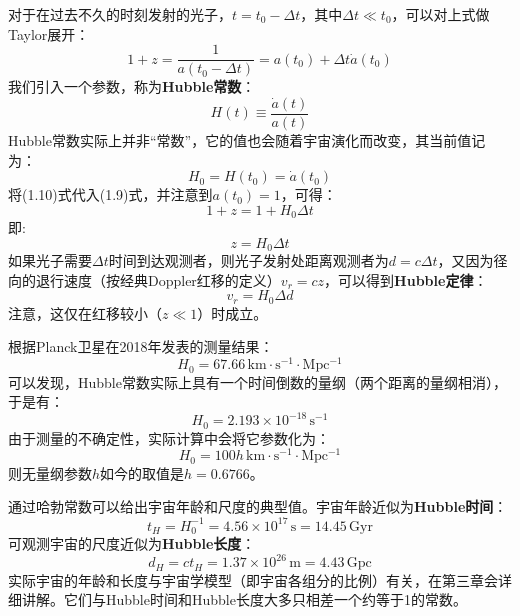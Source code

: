 \documentclass[fontset=none,openany,a4paper]{ctexbook}
\begin{document}
对于在过去不久的时刻发射的光子，$t = t_0 - \Delta t$，其中$\Delta t \ll t_0$，可以对上式做Taylor展开：
\begin{equation}
    1 + z = \frac{1}{a(t_0 - \Delta t)} = a(t_0) + \Delta t \dot{a}(t_0)
\end{equation}
我们引入一个参数，称为\textbf{Hubble常数}：
\begin{equation}
    H(t) \equiv \frac{\dot{a}(t)}{a(t)}
\end{equation}
Hubble常数实际上并非“常数”，它的值也会随着宇宙演化而改变，其当前值记为：
\begin{equation}
    H_0 = H(t_0) = \dot{a}(t_0)
\end{equation}
将(1.10)式代入(1.9)式，并注意到$a(t_0) = 1$，可得：
\begin{equation}
    1 + z = 1 + H_0 \Delta t
\end{equation}
即:
\begin{equation}
    z = H_0 \Delta t
\end{equation}
如果光子需要$\Delta t$时间到达观测者，则光子发射处距离观测者为$d = c\Delta t$，又因为径向的退行速度（按经典Doppler红移的定义）$v_r = cz$，可以得到\textbf{Hubble定律}：
\begin{equation}
    v_r = H_0 \Delta d
\end{equation}
注意，这仅在红移较小（$z \ll 1$）时成立。

根据Planck卫星在2018年发表的测量结果：
\begin{equation}
    H_0 = 67.66\,\mathrm{km \cdot s^{-1} \cdot Mpc^{-1}}
\end{equation}
可以发现，Hubble常数实际上具有一个时间倒数的量纲（两个距离的量纲相消），于是有：
\begin{equation}
    H_0 = 2.193 \times 10^{-18}\,\mathrm{s^{-1}}
\end{equation}
由于测量的不确定性，实际计算中会将它参数化为：
\begin{equation}
    H_0 = 100h \,\mathrm{km \cdot s^{-1} \cdot Mpc^{-1}}
\end{equation}
则无量纲参数$h$如今的取值是$h = 0.6766$。

通过哈勃常数可以给出宇宙年龄和尺度的典型值。宇宙年龄近似为\textbf{Hubble时间}：
\begin{equation}
    t_H = H_0^{-1} = 4.56 \times 10^{17}\,\mathrm{s} = 14.45 \,\mathrm{Gyr}
\end{equation}
可观测宇宙的尺度近似为\textbf{Hubble长度}：
\begin{equation}
    d_H = ct_H = 1.37 \times 10^{26}\,\mathrm{m} = 4.43\,\mathrm{Gpc}
\end{equation}
实际宇宙的年龄和长度与宇宙学模型（即宇宙各组分的比例）有关，在第三章会详细讲解。它们与Hubble时间和Hubble长度大多只相差一个约等于1的常数。
\end{document}
